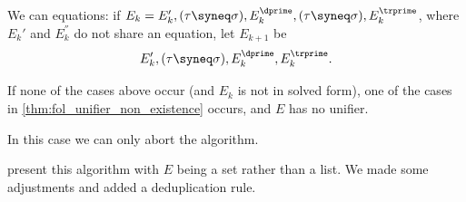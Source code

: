 \begin{algorithm}
\begin{thmenum}
     We can  equations: if \( E_k = E_k', (\tau \syneq \sigma), E_k^\dprime, (\tau \syneq \sigma), E_k^\trprime \), where \( E_k' \) and \( E_k^\dprime \) do not share an equation, let \( E_{k+1} \) be
    \begin{equation*}
      E_k', (\tau \syneq \sigma), E_k^\dprime, E_k^\trprime.
    \end{equation*}

     If none of the cases above occur (and \( E_k \) is not in solved form), one of the cases in \cref{thm:fol_unifier_non_existence} occurs, and \( E \) has no unifier.

    In this case we can only abort the algorithm.
  \end{thmenum}
\end{algorithm}
\begin{comments}
  \item \Textcite[74]{BaaderNipkow2012TermRewriting} present this algorithm with \( E \) being a set rather than a list. We made some adjustments and added a deduplication rule.
\end{comments}
